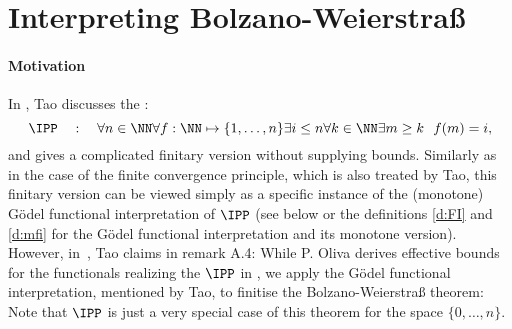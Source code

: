 \section{Interpreting Bolzano-Weierstra{\ss}} \label{s:bw}
\paragraph{Motivation}
In \cite{Tao07}, Tao discusses the :
\[
\IPP\quad:\quad\forall n\in\NN\forall f:\NN\mapsto\{1, \ldots, n\}\exists i\leq n
   \forall k\in\NN\exists m\geq k\ \ f(m)=i
\text{,}
\]
and gives a complicated finitary version without supplying bounds. 
Similarly as in the case of the finite convergence principle, which is also treated by Tao,
this finitary version can be viewed simply as a specific
instance of the (monotone) G\"odel functional interpretation of $\IPP$ (see 
below or the definitions \ref{d:FI} and \ref{d:mfi} for the G\"odel functional interpretation and
its monotone version). However, in~\cite{tao-2007}, Tao
claims in remark A.4:
While P. Oliva derives effective
bounds for the functionals realizing the $\IPP$ in 
\cite{Oliva06}, we apply the G\"odel functional interpretation, mentioned by Tao, 
to finitise the Bolzano-Weierstra{\ss} theorem:{\samepage
{} }
Note that $\IPP$ is just a very special case of this theorem for the space $\{0, \ldots, n\}$.\\
 
